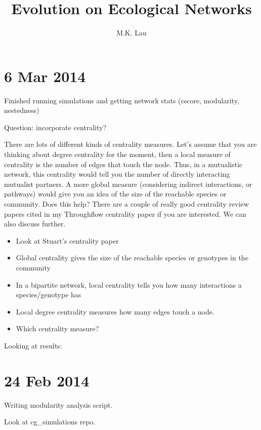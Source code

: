 \documentclass[12pt]{article}
\title{Evolution on Ecological Networks}
\author{M.K. Lau}
\begin{document}
\maketitle

\thispagestyle{empty}

\setcounter{tocdepth}{3}  %
\tableofcontents

\section{6 Mar 2014}

Finished running simulations and getting network stats (cscore,
modularity, nestedness)

Question: incorporate centrality?

There are lots of different kinds of centrality measures.  Let's
assume that you are thinking about degree centrality for the moment,
then a local measure of centrality is the number of edges that touch
the node.  Thus, in a mutualistic network, this centrality would tell
you the number of directly interacting mutualist partners.  A more
global measure (considering indirect interactions, or pathways) would
give you an idea of the size of the reachable species or community.
Does this help?  There are a couple of really good centrality review
papers cited in my Throughflow centrality paper if you are
interested.  We can also discuss further.

\begin{itemize}
\item Look at Stuart's centrality paper
\item Global centrality gives the size of the reachable species or
  genotypes in the community
\item In a bipartite network, local centrality tells you how many
  interactions a species/genotype has
\item Local degree centrality measures how many edges touch a node.
\item Which centrality measure? 
\end{itemize}

Looking at results: 


\section{24 Feb 2014}

Writing modularity analysis script.

Look at cg_simulations repo. 
\end{document}
